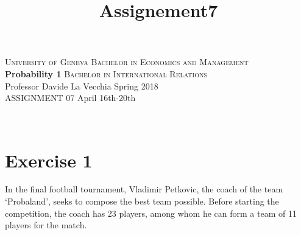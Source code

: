 \documentclass[12pt,thmsa]{article}
\title{Assignement7}
\begin{document}
\noindent \textsc{University of Geneva}     \hfill \textsc{Bachelor in Economics and Management} \\
\textbf{Probability 1}                      \hfill \textsc{Bachelor in International Relations} \\
Professor Davide La Vecchia                 \hfill Spring 2018  \\
ASSIGNMENT 07                               \hfill   April 16th-20th



\noindent
\makebox[\linewidth]{\rule{\textwidth}{0.4pt}}\\[1.5ex]


\section*{Exercise 1}

In the final football tournament, Vladimir Petkovic, the coach of the team `Probaland', seeks to compose the best team possible. Before starting the competition, the coach has 23 players, among whom he can form a team of 11 players for the match.
\medskip
\end{document}
